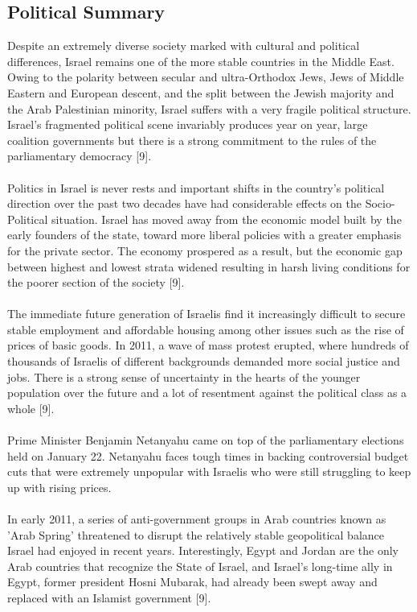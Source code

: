 \documentclass[10pt]{article}
\begin{document}
\subsection{Political Summary}
Despite an extremely diverse society marked with cultural and political differences, Israel remains one of the more stable countries in the Middle East. Owing to the polarity between secular and ultra-Orthodox Jews, Jews of Middle Eastern and European descent, and the split between the Jewish majority and the Arab Palestinian minority, Israel suffers with a very fragile political structure. Israel’s fragmented political scene invariably produces year on year, large coalition governments but there is a strong commitment to the rules of the parliamentary democracy [9].
\\
\\
Politics in Israel is never rests and important shifts in the country's political direction over the past two decades have had considerable effects on the Socio-Political situation. Israel has moved away from the economic model built by the early founders of the state, toward more liberal policies with a greater emphasis for the private sector. The economy prospered as a result, but the economic gap between highest and lowest strata widened resulting in harsh living conditions for the poorer section of the society [9].
\\
\\
The immediate future generation of Israelis find it increasingly difficult to secure stable employment and affordable housing among other issues such as the rise of prices of basic goods. In 2011, a wave of mass protest erupted, where hundreds of thousands of Israelis of different backgrounds demanded more social justice and jobs. There is a strong sense of uncertainty in the hearts of the younger population over the future and a lot of resentment against the political class as a whole [9].
\\
\\
Prime Minister Benjamin Netanyahu came on top of the parliamentary elections held on January 22. Netanyahu faces tough times in backing controversial budget cuts that were extremely unpopular with Israelis who were still struggling to keep up with rising prices.
\\
\\
In early 2011, a series of anti-government groups in Arab countries known as 'Arab Spring' threatened to disrupt the relatively stable geopolitical balance Israel had enjoyed in recent years. Interestingly, Egypt and Jordan are the only Arab countries that recognize the State of Israel, and Israel’s long-time ally in Egypt, former president Hosni Mubarak, had already been swept away and replaced with an Islamist government [9]. 
\end{document}
